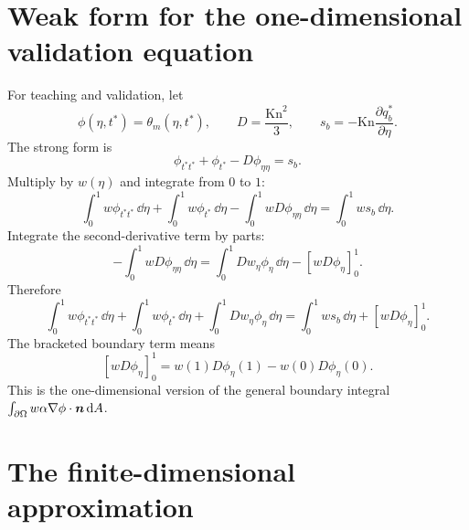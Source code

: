 \documentclass[11pt]{article}
\begin{document}
\section{Weak form for the one-dimensional validation equation}
For teaching and validation, let
\begin{equation}
    \phi(\eta,t^*)=\theta_m(\eta,t^*),
    \qquad
    D=\frac{\mathrm{Kn}^2}{3},
    \qquad
    s_b=-\mathrm{Kn}\frac{\partial q_b^*}{\partial\eta}.
\end{equation}
The strong form is
\begin{equation}
    \phi_{t^*t^*}+\phi_{t^*}-D\phi_{\eta\eta}=s_b.
\end{equation}
Multiply by \(w(\eta)\) and integrate from \(0\) to \(1\):
\begin{equation}
    \int_0^1 w\phi_{t^*t^*}\,\dd\eta
    +\int_0^1 w\phi_{t^*}\,\dd\eta
    -\int_0^1 wD\phi_{\eta\eta}\,\dd\eta
    =\int_0^1 ws_b\,\dd\eta.
\end{equation}
Integrate the second-derivative term by parts:
\begin{equation}
    -\int_0^1 wD\phi_{\eta\eta}\,\dd\eta
    =\int_0^1 D w_\eta\phi_\eta\,\dd\eta
    -\left[wD\phi_\eta\right]_{0}^{1}.
\end{equation}
Therefore
\begin{equation}
    \boxed{
    \int_0^1 w\phi_{t^*t^*}\,\dd\eta
    +\int_0^1 w\phi_{t^*}\,\dd\eta
    +\int_0^1 D w_\eta\phi_\eta\,\dd\eta
    =\int_0^1 ws_b\,\dd\eta
    +\left[wD\phi_\eta\right]_{0}^{1}.}
    \label{eq:fem_1d_weak}
\end{equation}
The bracketed boundary term means
\begin{equation}
    \left[wD\phi_\eta\right]_0^1
    =w(1)D\phi_\eta(1)-w(0)D\phi_\eta(0).
\end{equation}
This is the one-dimensional version of the general boundary integral \(\int_{\partial\Omega} w\alpha\nabla\phi\cdot\bm{n}\,\dd A\).

\section{The finite-dimensional approximation}
\end{document}
